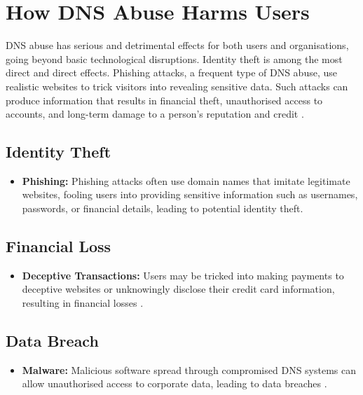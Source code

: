 \section{How DNS Abuse Harms Users}

DNS abuse has serious and detrimental effects for both users and organisations, going beyond basic technological disruptions. Identity theft is among the most direct and direct effects. Phishing attacks, a frequent type of DNS abuse, use realistic websites to trick visitors into revealing sensitive data. Such attacks can produce information that results in financial theft, unauthorised access to accounts, and long-term damage to a person's reputation and credit \cite{godaddy2023dnsabuse}.

\subsection{Identity Theft}
\begin{itemize}
    \item \textbf{Phishing:} Phishing attacks often use domain names that imitate legitimate websites, fooling users into providing sensitive information such as usernames, passwords, or financial details, leading to potential identity theft.
\end{itemize}

\subsection{Financial Loss}
\begin{itemize}
    \item \textbf{Deceptive Transactions:} Users may be tricked into making payments to deceptive websites or unknowingly disclose their credit card information, resulting in financial losses \cite{bohme2013economics}.
\end{itemize}

\subsection{Data Breach}
\begin{itemize}
    \item \textbf{Malware:} Malicious software spread through compromised DNS systems can allow unauthorised access to corporate data, leading to data breaches \cite{fowler2016data}.
\end{itemize}

